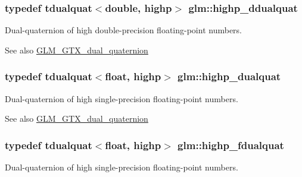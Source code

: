 \subsubsection[{highp\+\_\+ddualquat}]{\setlength{\rightskip}{0pt plus 5cm}typedef tdualquat$<$double, highp$>$ {\bf glm\+::highp\+\_\+ddualquat}}\label{group__gtx__dual__quaternion_ga83e4c5d27c8b0a264a3f3aed24f3f84e}
Dual-\/quaternion of high double-\/precision floating-\/point numbers.

\begin{DoxySeeAlso}{See also}
\hyperlink{group__gtx__dual__quaternion}{G\+L\+M\+\_\+\+G\+T\+X\+\_\+dual\+\_\+quaternion} 
\end{DoxySeeAlso}
\hypertarget{group__gtx__dual__quaternion_ga98557c3577757f2ced8f35b1de7fa234}{}
\subsubsection[{highp\+\_\+dualquat}]{\setlength{\rightskip}{0pt plus 5cm}typedef tdualquat$<$float, highp$>$ {\bf glm\+::highp\+\_\+dualquat}}\label{group__gtx__dual__quaternion_ga98557c3577757f2ced8f35b1de7fa234}
Dual-\/quaternion of high single-\/precision floating-\/point numbers.

\begin{DoxySeeAlso}{See also}
\hyperlink{group__gtx__dual__quaternion}{G\+L\+M\+\_\+\+G\+T\+X\+\_\+dual\+\_\+quaternion} 
\end{DoxySeeAlso}
\hypertarget{group__gtx__dual__quaternion_ga8c46d61c38b2b6d9c5091c667dd20fe8}{}
\subsubsection[{highp\+\_\+fdualquat}]{\setlength{\rightskip}{0pt plus 5cm}typedef tdualquat$<$float, highp$>$ {\bf glm\+::highp\+\_\+fdualquat}}\label{group__gtx__dual__quaternion_ga8c46d61c38b2b6d9c5091c667dd20fe8}
Dual-\/quaternion of high single-\/precision floating-\/point numbers.

